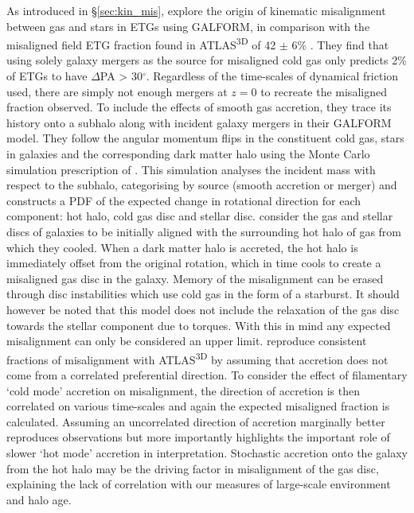 As introduced in \S \ref{sec:kin_mis}, \citet{lagos2015} explore the origin of kinematic misalignment between gas and stars in ETGs using GALFORM, in comparison with the misaligned field ETG fraction found in ATLAS\textsuperscript{3D} of 42 $\pm$ 6\%  \citep{davis2011a}. They find that using solely galaxy mergers as the source for misaligned cold gas only predicts 2\% of ETGs to have $\Delta$PA > 30$^{\circ}$. Regardless of the time-scales of dynamical friction used, there are simply not enough mergers at $z=0$ to recreate the misaligned fraction observed. To include the effects of smooth gas accretion, they trace its history onto a subhalo along with incident galaxy mergers in their GALFORM model. They follow the angular momentum flips in the constituent cold gas, stars in galaxies and the corresponding dark matter halo using the Monte Carlo simulation prescription of \citet{padilla2014}. This simulation analyses the incident mass with respect to the subhalo, categorising by source (smooth accretion or merger) and constructs a PDF of the expected change in rotational direction for each component: hot halo, cold gas disc and stellar disc. \citet{padilla2014,lagos2015} consider the gas and stellar discs of galaxies to be initially aligned with the surrounding hot halo of gas from which they cooled. When a dark matter halo is accreted, the hot halo is immediately offset from the original rotation, which in time cools to create a misaligned gas disc in the galaxy. Memory of the misalignment can be erased through disc instabilities which use cold gas in the form of a starburst. It should however be noted that this model does not include the relaxation of the gas disc towards the stellar component due to torques. With this in mind any expected misalignment can only be considered an upper limit. \citet{lagos2015} reproduce consistent fractions of misalignment with ATLAS\textsuperscript{3D} by assuming that accretion does not come from a correlated preferential direction. To consider the effect of filamentary `cold mode' accretion on misalignment, the direction of accretion is then correlated on various time-scales and again the expected misaligned fraction is calculated. Assuming an uncorrelated direction of accretion marginally better reproduces observations but more importantly highlights the important role of slower `hot mode' accretion in interpretation. Stochastic accretion onto the galaxy from the hot halo may be the driving factor in misalignment of the gas disc, explaining the lack of correlation with our measures of large-scale environment and halo age. 

